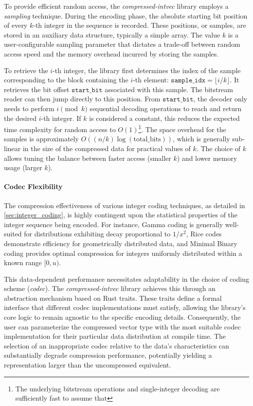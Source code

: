 To provide efficient random access, the \emph{compressed-intvec} library employs a \emph{sampling} technique. During the encoding phase, the absolute starting bit position of every $k$-th integer in the sequence is recorded. These positions, or samples, are stored in an auxiliary data structure, typically a simple array. The value $k$ is a user-configurable sampling parameter that dictates a trade-off between random access speed and the memory overhead incurred by storing the samples.

To retrieve the $i$-th integer, the library first determines the index of the sample corresponding to the block containing the $i$-th element: $\texttt{sample\_idx} = \lfloor i / k \rfloor$. It retrieves the bit offset $\texttt{start\_bit}$ associated with this sample. The bitstream reader can then jump directly to this position. From $\texttt{start\_bit}$, the decoder only needs to perform $i \pmod k$ sequential decoding operations to reach and return the desired $i$-th integer. If $k$ is considered a constant, this reduces the expected time complexity for random access to $O(1)$\footnote{The underlying bitstream operations and single-integer decoding are sufficiently fast to assume that}. The space overhead for the samples is approximately $O((n/k) \log(\text{total\_bits}))$, which is generally sub-linear in the size of the compressed data for practical values of $k$. The choice of $k$ allows tuning the balance between faster access (smaller $k$) and lower memory usage (larger $k$).

\paragraph{Codec Flexibility}
The compression effectiveness of various integer coding techniques, as detailed in \autoref{sec:integer_coding}, is highly contingent upon the statistical properties of the integer sequence being encoded. For instance, Gamma coding is generally well-suited for distributions exhibiting decay proportional to $1/x^2$, Rice codes demonstrate efficiency for geometrically distributed data, and Minimal Binary coding provides optimal compression for integers uniformly distributed within a known range $[0, u)$.

This data-dependent performance necessitates adaptability in the choice of coding scheme (\emph{codec}). The \emph{compressed-intvec} library achieves this through an abstraction mechanism based on Rust traits. These traits define a formal interface that different codec implementations must satisfy, allowing the library's core logic to remain agnostic to the specific encoding details. Consequently, the user can parameterize the compressed vector type with the most suitable codec implementation for their particular data distribution at compile time. The selection of an inappropriate codec relative to the data's characteristics can substantially degrade compression performance, potentially yielding a representation larger than the uncompressed equivalent.
